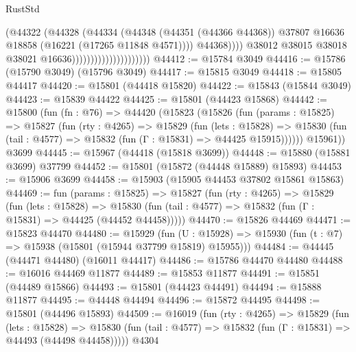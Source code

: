 \begin{lexlean}{RustStd}
\begin{coremodule}
                                                  (@44322
                                                    (@44328
                                                      (@44334
                                                        (@44348
                                                          (@44351 (@44366 @44368))
                                                          @37807
                                                          @16636
                                                          @18858
                                                          (@16221 (@17265 @11848 @4571))))
                                                      @44368))))
                                              @38012
                                              @38015
                                              @38018
                                              @38021
                                              @16636)))))))))))))))))))))
@44412 := @15784 @3049
@44416 := @15786 (@15790 @3049) (@15796 @3049)
@44417 := @15815 @3049
@44418 := @15805 @44417
@44420 := @15801 (@44418 @15820)
@44422 := @15843 (@15844 @3049)
@44423 := @15839 @44422
@44425 := @15801 (@44423 @15868)
@44442 := @15800
    (fun (fn : @76) =>
    @44420
      (@15823
        (@15826
          (fun (params : @15825) =>
          @15827
            (fun (rty : @4265) =>
            @15829
              (fun (lets : @15828) =>
              @15830 (fun (tail : @4577) => @15832 (fun (Γ : @15831) => @44425 @15915))))))
        @15961))
    @3699
@44445 := @15967 (@44418 (@15818 @3699))
@44448 := @15880 (@15881 @3699) @37799
@44452 := @15801 (@15872 (@44448 @15889) @15893)
@44453 := @15906 @3699
@44458 := @15903 (@15905 @44453 @37802 @15861 @15863)
@44469 := fun (params : @15825) =>
  @15827
    (fun (rty : @4265) =>
    @15829
      (fun (lets : @15828) =>
      @15830 (fun (tail : @4577) => @15832 (fun (Γ : @15831) => @44425 (@44452 @44458)))))
@44470 := @15826 @44469
@44471 := @15823 @44470
@44480 := @15929
    (fun (U : @15928) => @15930 (fun (t : @7) => @15938 (@15801 (@15944 @37799 @15819) @15955)))
@44484 := @44445 (@44471 @44480) (@16011 @44417)
@44486 := @15786 @44470 @44480
@44488 := @16016 @44469 @11877
@44489 := @15853 @11877
@44491 := @15851 (@44489 @15866)
@44493 := @15801 (@44423 @44491)
@44494 := @15888 @11877
@44495 := @44448 @44494
@44496 := @15872 @44495
@44498 := @15801 (@44496 @15893)
@44509 := @16019
    (fun (rty : @4265) =>
    @15829
      (fun (lets : @15828) =>
      @15830 (fun (tail : @4577) => @15832 (fun (Γ : @15831) => @44493 (@44498 @44458)))))
    @4304

\end{coremodule}
\end{lexlean}
